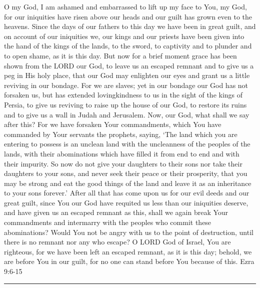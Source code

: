 \documentclass[]{book}
\begin{document}
O my God, I am ashamed and embarrassed to lift up my face to You, my
God, for our iniquities have risen above our heads and our guilt has
grown even to the heavens. Since the days of our fathers to this day we
have been in great guilt, and on account of our iniquities we, our kings
and our priests have been given into the hand of the kings of the lands,
to the sword, to captivity and to plunder and to open shame, as it is
this day. But now for a brief moment grace has been shown from the LORD
our God, to leave us an escaped remnant and to give us a peg in His holy
place, that our God may enlighten our eyes and grant us a little
reviving in our bondage. For we are slaves; yet in our bondage our God
has not forsaken us, but has extended lovingkindness to us in the sight
of the kings of Persia, to give us reviving to raise up the house of our
God, to restore its ruins and to give us a wall in Judah and Jerusalem.
Now, our God, what shall we say after this? For we have forsaken Your
commandments, which You have commanded by Your servants the prophets,
saying, `The land which you are entering to possess is an unclean land
with the uncleanness of the peoples of the lands, with their
abominations which have filled it from end to end and with their
impurity. So now do not give your daughters to their sons nor take their
daughters to your sons, and never seek their peace or their prosperity,
that you may be strong and eat the good things of the land and leave it
as an inheritance to your sons forever.' After all that has come upon us
for our evil deeds and our great guilt, since You our God have requited
us less than our iniquities deserve, and have given us an escaped
remnant as this, shall we again break Your commandments and intermarry
with the peoples who commit these abominations? Would You not be angry
with us to the point of destruction, until there is no remnant nor any
who escape? O LORD God of Israel, You are righteous, for we have been
left an escaped remnant, as it is this day; behold, we are before You in
our guilt, for no one can stand before You because of this. \textbar{}
Ezra 9:6-15

\begin{center}\rule{0.5\linewidth}{\linethickness}\end{center}
\end{document}
